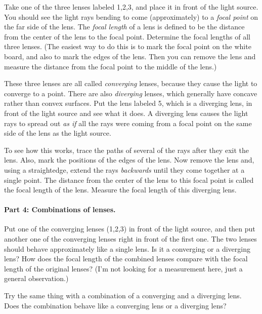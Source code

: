 Take one of the three lenses labeled 1,2,3, and place it in front
of the light source.  You should see the light rays bending to
come (approximately) to a {\it focal point} on the far side of the lens.  
The {\it focal length} of a lens is defined to be the distance from the center
of the lens to the focal point.  Determine the focal lengths of all
three lenses.  (The easiest way to do this is to mark the focal point
on the white board, and also to mark the edges of the lens.  Then
you can remove the lens and measure the distance from the focal
point to the middle of the lens.)

\vskip 2.5in

These three lenses are all called {\it converging} lenses, because
they cause the light to converge to a point.  There are also {\it diverging}
lenses, which generally have concave rather than convex surfaces.  Put
the lens labeled 5, which is a diverging lens, 
in front of the light source and see what it does.
A diverging lens causes the light rays to spread out {\it as if} all the
rays were coming from a focal point on the same side of the lens
as the light source.

To see how this works, trace the paths of several of the rays 
after they exit the lens.  Also, mark the positions of the edges
of the lens.  Now remove the lens and, using a straightedge, extend
the rays {\it backwards} until they come together at a single point.  
The distance from the center of the lens to this focal point is
called the focal length of the lens.  Measure the focal length
of this diverging lens.

\vskip 1in

\paragraph{Part 4: Combinations of lenses.}
Put one of the converging lenses (1,2,3) in front of the light source, and
then put another one of the converging lenses right in front of the first
one.  The two lenses should behave approximately like a single lens.
Is it a converging or a diverging lens?  How does the focal length of
the combined lenses compare with the focal length of the original
lenses?  (I'm not looking for a measurement here, just a general
observation.)

\vskip 1.5in

Try the same thing with a combination of a converging and a diverging
lens.  Does the combination behave like a converging lens or a diverging
lens?  

